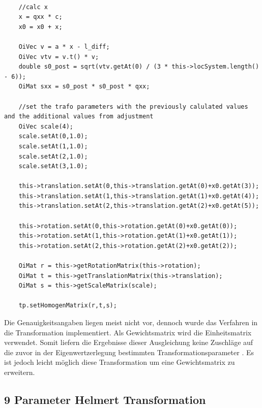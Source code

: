 \begin{lstlisting}[caption={Anwenden der Zuschläge},captionpos=t]

	//calc x
    x = qxx * c;
    x0 = x0 + x;

    OiVec v = a * x - l_diff;
    OiVec vtv = v.t() * v;
    double s0_post = sqrt(vtv.getAt(0) / (3 * this->locSystem.length() - 6));
    OiMat sxx = s0_post * s0_post * qxx;

    //set the trafo parameters with the previously calulated values and the additional values from adjustment
    OiVec scale(4);
    scale.setAt(0,1.0);
    scale.setAt(1,1.0);
    scale.setAt(2,1.0);
    scale.setAt(3,1.0);

    this->translation.setAt(0,this->translation.getAt(0)+x0.getAt(3));
    this->translation.setAt(1,this->translation.getAt(1)+x0.getAt(4));
    this->translation.setAt(2,this->translation.getAt(2)+x0.getAt(5));

    this->rotation.setAt(0,this->rotation.getAt(0)+x0.getAt(0));
    this->rotation.setAt(1,this->rotation.getAt(1)+x0.getAt(1));
    this->rotation.setAt(2,this->rotation.getAt(2)+x0.getAt(2));

    OiMat r = this->getRotationMatrix(this->rotation);
    OiMat t = this->getTranslationMatrix(this->translation);
    OiMat s = this->getScaleMatrix(scale);

    tp.setHomogenMatrix(r,t,s);

\end{lstlisting}

Die Genauigkeitsangaben liegen meist nicht vor, dennoch wurde das Verfahren in die Transformation implementiert. Als Gewichtsmatrix wird die Einheitsmatrix verwendet. Somit liefern die Ergebnisse dieser Ausgleichung keine Zuschläge auf die zuvor in der Eigenwertzerlegung bestimmten Transformationsparameter \cite{Drixler1993}. Es ist jedoch leicht möglich diese Transformation um eine Gewichtsmatrix zu erweitern.

\subsection{9 Parameter Helmert Transformation}\label{sec:9paramhelmert}

